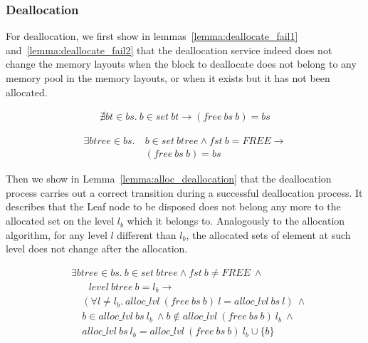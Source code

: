\subsubsection{Deallocation}\label{sec:functionalDealloc}
For deallocation, we first show in lemmas~\ref{lemma:deallocate_fail1} and~\ref{lemma:deallocate_fail2} that the deallocation service indeed does not change the memory layouts when the block to deallocate does not belong to any memory pool in the memory layouts, or when it exists but it has not been allocated.

\begin{lemma} 
\label{lemma:deallocate_fail1}
\begin{align*}
\nexists bt \in bs.\ b \in set\ bt \longrightarrow (free\ bs\ b) = bs
\end{align*}
\end{lemma}
	
\begin{lemma} 
\label{lemma:deallocate_fail2}
\begin{align*}
\exists btree \in bs.\ &b\in set\ btree \wedge fst\ b = FREE \longrightarrow \\ 
&(free\ bs\ b) = bs
\end{align*}
\end{lemma}

Then we show in Lemma~\ref{lemma:alloc_deallocation} that the deallocation process carries out a correct transition during a successful deallocation process. It describes that the Leaf node to be disposed does not belong any more to the allocated set on the level $l_b$ which it belongs to. Analogously to the allocation algorithm, for any level $l$ different than $l_b$, the allocated sets of element at such level does not change after the allocation.

\begin{lemma} 
\label{lemma:alloc_deallocation}
\end{lemma}
\vspace{-7pt}
\begin{align*}
&\exists btree \in bs.\ b \in set\ btree \wedge fst\ b \neq FREE\ \wedge\\
&\ \ \ \ \ \ \ \ level\ btree\ b = l_b \longrightarrow\\
&\ \ \ \ \ (\forall l \ne l_b.\ alloc\_lvl\ (free\ bs\ b)\ l = alloc\_lvl\ bs\ l)\ \wedge\\
&\ \ \ \ \ b \in alloc \_lvl\ bs\ l_b\ \wedge b \notin alloc\_lvl\ (free\ bs\ b)\ l_b\ \wedge\\
&\ \ \ \ \ alloc\_lvl\ bs\ l_b = alloc\_lvl\ (free\ bs\ b)\ l_b \cup \lbrace b \rbrace
\end{align*}
\vspace{-12pt}

